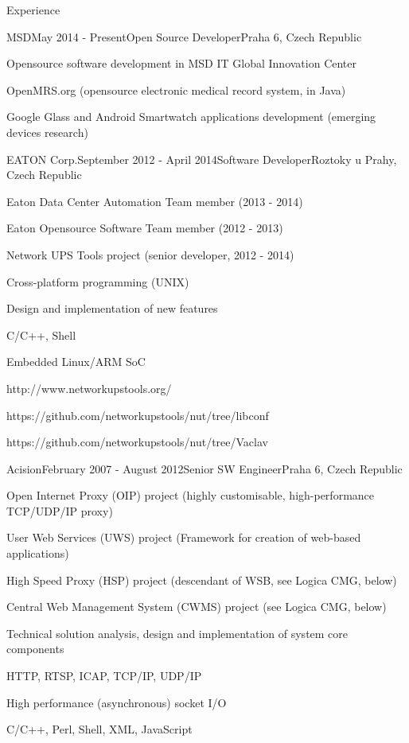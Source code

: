 \documentclass{resume} %
\begin{document}
\begin{rSection}{Experience}

\begin{rSubsection}{MSD}{May 2014 - Present}{Open Source Developer}{Praha 6, Czech Republic}
\item Opensource software development in MSD IT Global Innovation Center
\item OpenMRS.org (opensource electronic medical record system, in Java)
\item Google Glass and Android Smartwatch applications development (emerging devices research)
\end{rSubsection}


\begin{rSubsection}{EATON Corp.}{September 2012 - April 2014}{Software Developer}{Roztoky u Prahy, Czech Republic}
\item Eaton Data Center Automation Team member (2013 - 2014)
\item Eaton Opensource Software Team member (2012 - 2013)
\item Network UPS Tools project (senior developer, 2012 - 2014)
\item Cross-platform programming (UNIX)
\item Design and implementation of new features
\item C/C++, Shell
\item Embedded Linux/ARM SoC
\item http://www.networkupstools.org/
\item https://github.com/networkupstools/nut/tree/libconf
\item https://github.com/networkupstools/nut/tree/Vaclav
\end{rSubsection}


\begin{rSubsection}{Acision}{February 2007 - August 2012}{Senior SW Engineer}{Praha 6, Czech Republic}
\item Open Internet Proxy (OIP) project (highly customisable, high-performance TCP/UDP/IP proxy)
\item User Web Services (UWS) project (Framework for creation of web-based applications)
\item High Speed Proxy (HSP) project (descendant of WSB, see Logica CMG, below)
\item Central Web Management System (CWMS) project (see Logica CMG, below)
\item Technical solution analysis, design and implementation of system core components
\item HTTP, RTSP, ICAP, TCP/IP, UDP/IP
\item High performance (asynchronous) socket I/O
\item C/C++, Perl, Shell, XML, JavaScript
\end{rSubsection}


\end{rSection}
\end{document}
